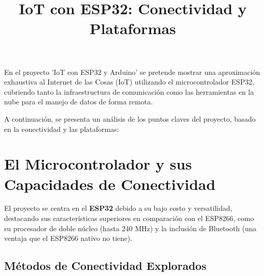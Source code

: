 \documentclass{article}
\title{IoT con ESP32: Conectividad y Plataformas}
\author{}
\date{}
\begin{document}
\maketitle
\tableofcontents
\vspace{1cm}

En el proyecto 'IoT con ESP32 y Arduino' se pretende mostrar una 
aproximación exhaustiva al Internet de las Cosas (IoT) utilizando el 
microcontrolador ESP32, cubriendo tanto la infraestructura de 
comunicación como las herramientas en la nube para el manejo de datos de 
forma remota.

A continuación, se presenta un análisis de los puntos claves del proyecto, 
basado en la conectividad y las plataformas:

\section{El Microcontrolador y sus Capacidades de Conectividad}

El proyecto se centra en el \textbf{ESP32} debido a su bajo costo y 
versatilidad, destacando sus características superiores en comparación 
con el ESP8266, como su procesador de doble núcleo (hasta 240 MHz) y la 
inclusión de Bluetooth (una ventaja que el ESP8266 nativo no tiene).

\subsection{Métodos de Conectividad Explorados}
\end{document}
